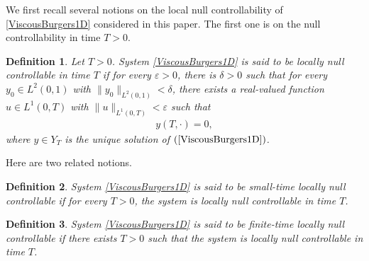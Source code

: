 \documentclass[11pt, reqno]{amsart}
\theoremstyle{plain}
\newtheorem{definition}{Definition}[section]
\numberwithin{equation}{section}
\begin{document}
\medskip
We first recall several notions on the local null controllability of \eqref{ViscousBurgers1D} considered in this paper. The first one is on the null controllability in time $T>0$. 

\begin{definition} Let $T>0$. System \eqref{ViscousBurgers1D} is said to be \textit{locally null controllable in time $T$} if for every $\varepsilon > 0$, there is $\delta > 0$ such that for every $y_0 \in L^2(0, 1)$ with $\| y_0\|_{L^2(0, 1)} < \delta$, there exists a real-valued function $u \in L^1(0, T)$ with $\| u \|_{L^1(0, T)} < \varepsilon$ such that
\begin{align*}
    y(T, \cdot) = 0,
\end{align*}
where $y \in Y_T$ is the unique solution of $(\ref{ViscousBurgers1D})$.
\end{definition}

Here are two related notions. 

\begin{definition} System \eqref{ViscousBurgers1D} is said to be small-time locally null controllable if for every $T>0$, the system is locally null controllable in time $T$. 
\end{definition}

\begin{definition} System \eqref{ViscousBurgers1D} is said to be finite-time locally null controllable if there exists $T>0$ such that the system is locally null controllable in time $T$.
\end{definition}
\end{document}
